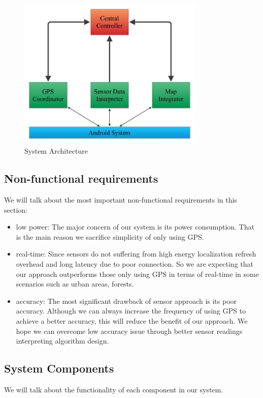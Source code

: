 \documentclass[journal]{IEEEtran}
\begin{document}
\begin{figure}
	\centering
	\includegraphics[width=3.5in]{figures/sysArc}
	\caption{System Architecture}
\end{figure}

\subsection{Non-functional requirements}
We will talk about the most important non-functional requirements in this section:

\begin{itemize}
	\item low power: 
		The major concern of our system is its power consumption. That is the main reason we sacrifice simplicity of only using GPS.
	\item real-time: 
		Since sensors do not suffering from high energy localization refresh overhead and long latency due to poor connection. 
		So we are expecting that our approach outperforms those only using GPS in terms of real-time in some scenarios such as urban areas, forests.
	\item accuracy: 
		The most significant drawback of sensor approach is its poor accuracy. 
		Although we can always increase the frequency of using GPS to achieve a better accuracy, this will reduce the benefit of our approach.
		We hope we can overcome low accuracy issue through better sensor readings interpreting algorithm design.
\end{itemize}

\subsection{System Components}
We will talk about the functionality of each component in our system.
\end{document}
